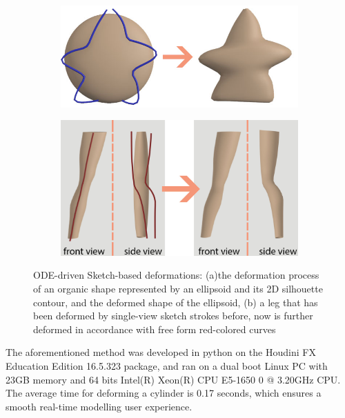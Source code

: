 \documentclass[runningheads]{llncs}
\begin{document}
\begin{figure}[!htbp]
    \centering
    \begin{subfigure}[h]{.45\textwidth}
    \includegraphics[height=1 in]{jelly.jpg}
    \caption{}
    \label{fig:sea star}
    \end{subfigure}
    \hspace{2em}
    \begin{subfigure}[h]{.45\textwidth}
    \includegraphics[height=1.3 in]{leg_transformation_free_form.jpg}
    \caption{}
    \label{fig:leg deformed twice}
    \end{subfigure}
    \caption{ODE-driven Sketch-based deformations: (a)the deformation process of an organic shape represented by an ellipsoid and its 2D silhouette contour, and the deformed shape of the ellipsoid, (b) a leg that has been deformed by single-view sketch strokes before, now is further deformed in accordance with free form red-colored curves}
    \label{fig:ODE-driven Sketch-based deformations}
\end{figure}

The aforementioned method was developed in python on the Houdini FX Education Edition 16.5.323 package, and ran on a dual boot Linux PC with 23GB memory and 64 bits Intel(R) Xeon(R) CPU E5-1650 0 @ 3.20GHz CPU. The average time for deforming a cylinder is 0.17 seconds, which ensures a smooth real-time modelling user experience.
\end{document}
